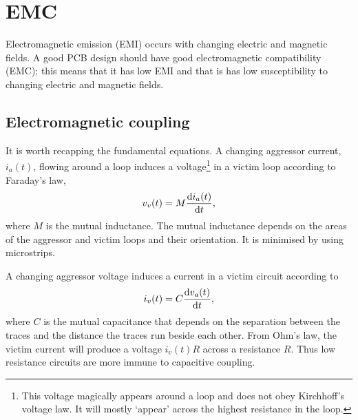 \chapter{EMC}


Electromagnetic emission (EMI) occurs with changing electric and
magnetic fields.  A good PCB design should have good electromagnetic
compatibility (EMC); this means that it has low EMI and that is has
low susceptibility to changing electric and magnetic fields.


\section{Electromagnetic coupling}

It is worth recapping the fundamental equations.  A changing aggressor
current, $i_a(t)$, flowing around a loop induces a
voltage\footnote{This voltage magically appears around a loop and does
  not obey Kirchhoff's voltage law.  It will mostly `appear' across
  the highest resistance in the loop.} in a victim loop according to
Faraday's law,
%
\begin{equation}
  v_v(t) = M \frac{\mathrm{d} i_a(t)}{\mathrm{d} t},
\end{equation}
%
where $M$ is the mutual inductance.  The mutual inductance depends on
the areas of the aggressor and victim loops and their orientation.  It
is minimised by using microstrips.

A changing aggressor voltage induces a current in a victim circuit
according to
%
\begin{equation}
  i_v(t) = C \frac{\mathrm{d} v_a(t)}{\mathrm{d} t},
\end{equation}
%
where $C$ is the mutual capacitance that depends on the separation
between the traces and the distance the traces run beside each other.
From Ohm's law, the victim current will produce a voltage $i_v(t) R$
across a resistance $R$.  Thus low resistance circuits are more immune
to capacitive coupling.
